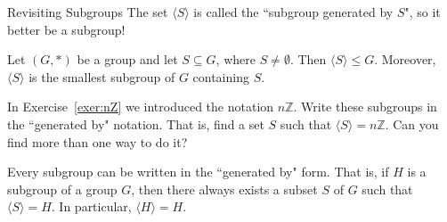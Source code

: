 \begin{section}{Revisiting Subgroups}
The set $\langle S\rangle$ is called the ``subgroup generated by $S$", so it better be a subgroup!

\begin{theorem}\label{thm:smallest_subgroup_containing_S}
Let $(G,*)$ be a group and let $S\subseteq G$, where $S\neq \emptyset$.  Then $\langle S\rangle \leq G$.  Moreover, $\langle S\rangle$ is the smallest subgroup of $G$ containing $S$.
\end{theorem}

\begin{exercise}
In Exercise~\ref{exer:nZ} we introduced the notation $n\mathbb{Z}$.  Write these subgroups in the ``generated by" notation.  That is, find a set $S$ such that $\langle S\rangle =n\mathbb{Z}$.  Can you find more than one way to do it?
\end{exercise}

Every subgroup can be written in the ``generated by" form.  That is, if $H$ is a subgroup of a group $G$, then there always exists a subset $S$ of $G$ such that $\langle S\rangle=H$.  In particular, $\langle H\rangle=H$.


\end{section}
